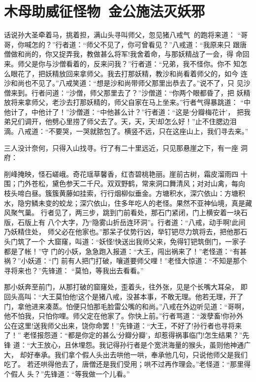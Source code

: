 \chapter{木母助威征怪物~金公施法灭妖邪}

话说孙大圣牵着马，挑着担，满山头寻叫师父，忽见猪八戒气的跑将来道：
“哥哥，你喊怎的？”行者道：“师父不见了，你可曾看见？”八戒道：“我原来只
跟唐僧做和尚的，你又捉弄我，教做甚么将军!我舍着命，与那妖精战了一会，得
命回来。师父是你与沙僧看着的，反来问我？”行者道：“兄弟，我不怪你。你不
知怎么眼花了，把妖精放回来拿师父。我去打那妖精，教沙和尚看着师父的，如今
连沙和尚也不见了。”八戒笑道：“想是沙和尚带师父那里出恭去了。”说不了，只
见沙僧来到。行者问道：“沙僧，师父那里去了？”沙僧道：“你两个眼都昏了，把
妖精放将来拿师父，老沙去打那妖精的，师父自家在马上坐来。”行者气得暴跳道：
“中他计了，中他计了！”沙僧道：“中他甚么计？”行者道：“这是‘分瓣梅花计’，
把我弟兄们调开，他劈心里捞了师父去了。天，天，天!却怎么好！”止不住腮边泪
滴。八戒道：“不要哭，一哭就脓包了。横竖不远，只在这座山上，我们寻去来。”

三人没计奈何，只得入山找寻。行了有二十里远近，只见那悬崖之下，有一座
洞府：

削峰掩映，怪石嵯峨。奇花瑶草馨香，红杏碧桃艳丽。崖前古树，霜皮溜雨四
十围；门外苍松，黛色参天二千尺。双双野鹤，常来洞口舞清风；对对山禽，每向
枝头啼白昼。簇簇黄藤如挂索，行行烟柳似垂金。方塘积水，深穴依山：方塘积
水，隐穷鳞未变的蛟龙；深穴依山，住多年吃人的老怪。果然不亚神仙境，真是藏
风聚气巢。
行者见了，两三步，跳到门前看处，那石门紧闭，门上横安着一块石版，石版上有
八个大字，乃“隐雾山折岳连环洞”。行者道：“八戒，动手啊!此间乃妖精住处，
师父必在他家也。”那呆子仗势行凶，举钉钯尽力筑将去，把他那石头门筑了一个
大窟窿，叫道：“妖怪!快送出我师父来，免得钉钯筑倒门，一家子都是了帐！”守
门的小妖，急急跑入报道：“大王，闯出祸来了！”老怪道：“有甚祸？”小妖道：“门
前有人把门打破，嚷道要师父哩！”老怪大惊道：“不知是那个寻将来也？”先锋道：
“莫怕，等我出去看看。”

那小妖奔至前门，从那打破的窟窿处，歪着头，往外张，见是个长嘴大耳朵，
即回头高叫：“大王莫怕他!这个是猪八戒，没甚本事，不敢无理。他若无理，开了
门，拿他进来凑蒸。怕便只怕那毛脸雷公嘴的和尚。”八戒在外边听见道：“哥啊，
他不怕我，只怕你哩。师父定在他家了。你快上前。”行者骂道：“泼孽畜!你孙外
公在这里!送我师父出来，饶你命罢！”先锋道：“大王，不好了!孙行者也寻将来了！”
老怪报怨道：“都是你定的甚么‘分瓣分瓣’，却惹得祸事临门!怎生结果？”先锋
道：“大王放心，且休埋怨。我记得孙行者是个宽洪海量的猴头，虽则他神通广大，
却好奉承。我们拿个假人头出去哄他一哄，奉承他几句，只说他师父是我们吃了。
若还哄得他去了，唐僧还是我们受用；哄不过再作理会。”老怪道：“那里得个假人
头？”先锋道：“等我做一个儿看。”

